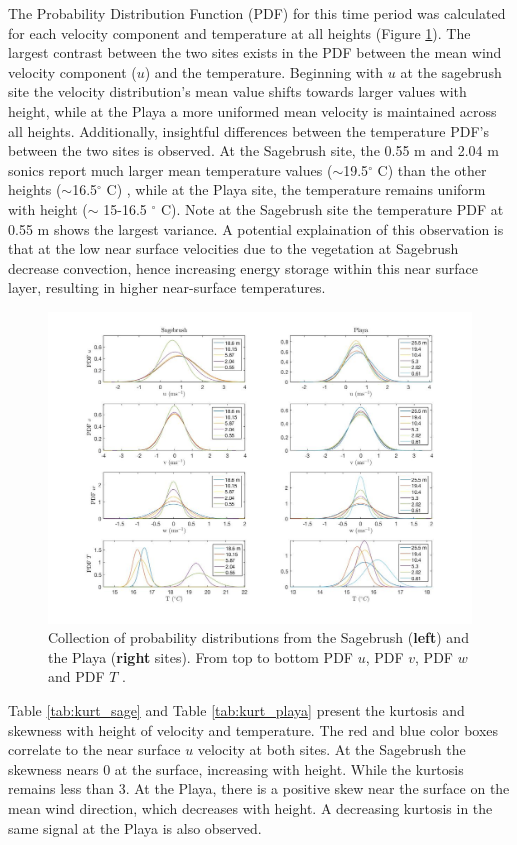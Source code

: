 \documentclass[]{article}
\begin{document}
The Probability Distribution Function (PDF) for this time period was calculated for each velocity component and temperature at all heights (Figure \ref{fig:pdf}). The largest contrast between the two sites exists in the PDF between the mean wind velocity component ($u$) and the temperature. Beginning with $u$ at the sagebrush site the velocity distribution's mean value shifts towards larger values with height, while at the Playa a more uniformed mean velocity is maintained across all heights. Additionally, insightful differences between the temperature PDF's between the two sites is observed. At the Sagebrush site, the 0.55 m and 2.04 m sonics report much larger mean temperature values ($\sim$19.5$^\circ$ C) than the other heights ($\sim$16.5$^\circ$ C) , while at the Playa site, the temperature remains uniform with height ($\sim$ 15-16.5 $^\circ$ C). Note at the Sagebrush site the temperature PDF at 0.55 m shows the largest variance. A potential explaination of this observation is that at the low near surface velocities due to the vegetation at Sagebrush decrease convection, hence increasing energy storage within this near surface layer, resulting in higher near-surface temperatures.  
\begin{figure}
	\centering
	\includegraphics[width=\textwidth]{pdf}
	\caption{Collection of probability distributions from the Sagebrush (\textbf{left}) and the Playa (\textbf{right} sites). From top to bottom PDF $u$, PDF $v$,  PDF $w$ and PDF $T$ . }
	\label{fig:pdf}
\end{figure}
Table \ref{tab:kurt_sage} and Table \ref{tab:kurt_playa} present the kurtosis and skewness with height of velocity and temperature. The red and blue color boxes correlate to the near surface $u$ velocity at both sites. At the Sagebrush the skewness nears 0 at the surface, increasing with height. While the kurtosis remains less than 3. At the Playa, there is a positive skew near the surface on the mean wind direction, which decreases with height. A decreasing kurtosis in the same signal at the Playa is also observed.
\end{document}
